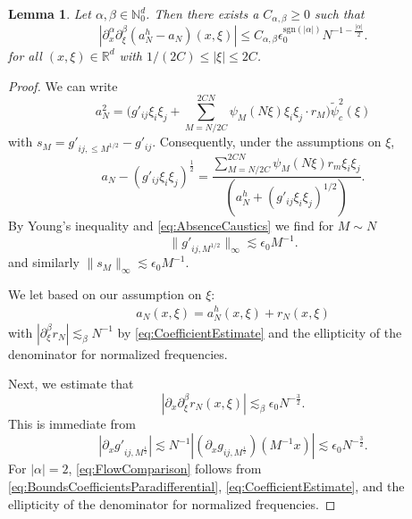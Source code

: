 \documentclass{amsart}
\numberwithin{equation}{section}
\newtheorem{lemma}[theorem]{Lemma}
\theoremstyle{definition}
\newcommand{\R}{\mathbb{R}}
\newcommand{\Rd}{\mathbb{R}^{d}}
\newcommand{\N}{\mathbb{N}}
\begin{document}
\begin{lemma}
\label{lem:DifferenceEstimates}
Let $\alpha,\beta\in \N_{0}^{d}$. Then there exists a $C_{\alpha,\beta}\geq0$ such that%
\begin{equation}
\label{eq:FlowComparison}
|\partial_x^{\alpha} \partial_{\xi}^{\beta}(a_{N}^{h}-a_{N})(x,\xi)| \leq C_{\alpha,\beta} \epsilon_0^{\text{sgn}(|\alpha|)} N^{-1-\frac{|\alpha|}{2}}.
\end{equation}
for all %
$(x,\xi)\in\Rd$ with $1/(2C) \leq |\xi|\leq 2C$. 
\end{lemma}
\begin{proof}
We can write
\begin{equation*}
a_N^2 = \big( g'_{ij} \xi_i \xi_j + \sum_{M=N/2C}^{2CN} \psi_M(N \xi) \xi_i \xi_j \cdot r_M \big) \tilde{\psi}_c^2(\xi)
\end{equation*}
with $s_M = g'_{ij,\leq M^{1/2}} - g'_{ij}$. Consequently, under the assumptions on $\xi$,
\begin{equation*}
   a_N - (g'_{ij} \xi_i \xi_j)^{\frac{1}{2}} = \frac{\sum_{M=N/2C}^{2CN} \psi_M(N \xi) r_m \xi_i \xi_j}{(a_N^h + (g'_{ij} \xi_i \xi_j)^{1/2}) }.
\end{equation*}
By Young's inequality and \eqref{eq:AbsenceCaustics} we find for $M \sim N$
\begin{equation}
\label{eq:CoefficientEstimate}
\| g'_{ij,M^{1/2}} \|_{\infty} \lesssim \epsilon_0 M^{-1}.
\end{equation}
and similarly $\| s_M \|_{\infty} \lesssim \epsilon_0 M^{-1}$.

We let based on our assumption on $\xi$:%
\begin{equation*}
\begin{split}
a_N(x,\xi) = a_N^{h}(x,\xi) + r_N(x,\xi)
\end{split}
\end{equation*}
with $|\partial_{\xi}^{\beta} r_N| \lesssim_{\beta} N^{-1}$ by  \eqref{eq:CoefficientEstimate} and the ellipticity of the denominator for normalized frequencies.

Next, we estimate that 
\begin{equation*}
|\partial_x \partial_{\xi}^{\beta} r_N(x,\xi)| \lesssim_{\beta} \epsilon_0 N^{-\frac{3}{2}}.
\end{equation*}
This is immediate from 
\begin{equation*}
|\partial_x g'_{ij,M^{\frac{1}{2}}}| \lesssim N^{-1} | (\partial_x g_{ij,M^{\frac{1}{2}}})(M^{-1} x)| \lesssim \epsilon_0 N^{-\frac{3}{2}}.
\end{equation*}
For $|\alpha| = 2$, \eqref{eq:FlowComparison} follows from \eqref{eq:BoundsCoefficientsParadifferential},  \eqref{eq:CoefficientEstimate}, and the ellipticity of the denominator for normalized frequencies.
\end{proof}
\end{document}
